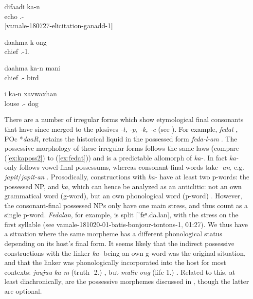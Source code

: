  \ea\label{ex:kan2}
 \gll difaadi ka-n\\
  echo .-\\ 
 \glt {} {[vamale-180727-elicitation-ganadd-1]}
 \z
 
 \ea\label{ex:kaposs1}
 \gll  daahma k-ong\\ 
  chief .-1.\\ 
 \glt {}
 \z
 
 
 
 \ea\label{ex:kaposs2}
 \gll daahma ka-n mani\\ 
  chief .- bird\\ 
 \glt {}
 \z
 


\ea\label{ex:kan1}
\gll i ka-n xavwaxhan\\
 louse .- dog\\
\glt {}
 \z


 There are a number of irregular forms which show etymological final consonants that have since merged to the plosives \textit{-t, -p, -k, -c} (see ). For example, \textit{fedat} , POc *\textit{daaR}, retains the historical liquid in the possessed form \textit{feda-l-am} . The possessive morphology of these irregular forms follows the same laws (compare (\ref{ex:kaposs2}) to (\ref{ex:fedat})) and is a predictable allomorph of \textit{ka-}. In fact \textit{ka-} only follows vowel-final possessums, whereas consonant-final words take \textit{-an}, e.g. \textit{japit}/\textit{japit-an} . Prosodically, constructions with \textit{ka-} have at least two p-words: the possessed NP, and \textit{ka}, which can hence be analyzed as an anticlitic: not an own grammatical word (g-word), but an own phonological word (p-word) \parencite{zuniga_anti_2014}. However, the consonant-final possessed NPs only have one main stress, and thus count as a single p-word. \textit{Fedalan}, for example, is split [ˈfɛⁿ.da.lan], with the stress on the first syllable (see vamale-181020-01-batis-bonjour-tontons-1, 01:27). We thus have a situation where the same morpheme has a different phonological status depending on its host's final form.  It seems likely that the indirect possessive constructions with the linker \textit{ka-} being an own g-word was the original situation, and that the linker was phonologically incorporated into the host for most contexts: \textit{juujuu ka-m} (truth -2.) , but \textit{muliv-ong} (life 1.) . Related to this, at least diachronically, are the possessive morphemes discussed in , though the latter are optional. %
 
